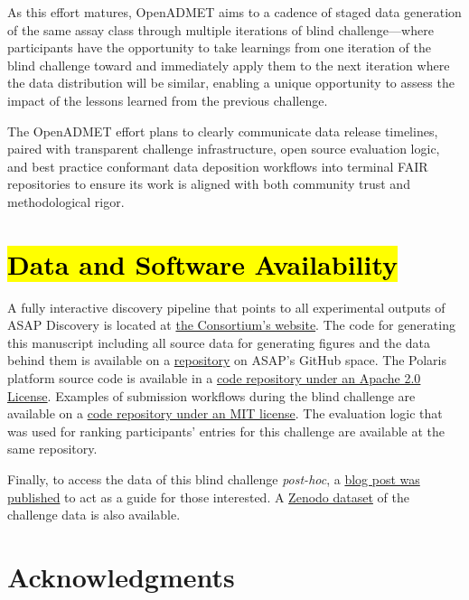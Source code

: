 \documentclass[journal=jcim,manuscript=article]{achemso}
\begin{document}
As this effort matures, OpenADMET aims to a cadence of staged data generation of the same assay class through multiple iterations of blind challenge---where participants have the opportunity to take learnings from one iteration of the blind challenge toward and immediately apply them to the next iteration where the data distribution will be similar, enabling a unique opportunity to assess the impact of the lessons learned from the previous challenge. 

The OpenADMET effort plans to clearly communicate data release timelines, paired with transparent challenge infrastructure, open source evaluation logic, and best practice conformant data deposition workflows into terminal FAIR repositories to ensure its work is aligned with both community trust and methodological rigor.

\section{\hl{Data and Software Availability}}
A fully interactive discovery pipeline that points to all experimental outputs of ASAP Discovery is located at \href{https://asapdiscovery.org/pipeline/}{the Consortium's website}. The code for generating this manuscript including all source data for generating figures and the data behind them is available on a \href{https://github.com/asapdiscovery/asap-blind-challenge-paper}{repository} on ASAP's GitHub space. The Polaris platform source code is available in a \href{https://github.com/polaris-hub/polaris}{code repository under an Apache 2.0 License}. Examples of submission workflows during the blind challenge are available on a \href{https://github.com/asapdiscovery/asap-polaris-blind-challenge-examples}{code repository under an MIT license}. The evaluation logic that was used for ranking participants' entries for this challenge are available at the same repository. 

Finally, to access the data of this blind challenge \textit{post-hoc}, a \href{https://blog.omsf.io/how-to-access-the-asap-discovery-x-polarishub-x-openadmet-challenge-data/}{blog post was published} to act as a guide for those interested. A \href{https://zenodo.org/records/15582067}{Zenodo dataset} of the  challenge data is also available.

\section{Acknowledgments}
\end{document}

